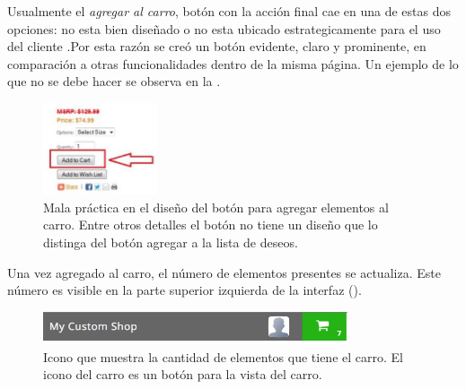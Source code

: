 		Usualmente el \textit{agregar al carro}, botón con la acción final \websiteINT \ecommerceCOM cae en una de estas dos opciones: no esta bien diseñado o no esta ubicado estrategicamente para el uso del cliente \cite{online_official_usabilitygeek_guidelines_usability}.Por esta razón se creó un botón evidente, claro y prominente, en comparación a otras funcionalidades dentro de la misma página. Un ejemplo de lo que no se debe hacer se observa en la .

		\begin{figure}[H]
			\centering
			\includegraphics[width=0.3\textwidth]{figuras/productos/examples/usabilitygeek_guidelines_wrong_ui_add_to_cart.png}
			\caption{Mala práctica en el diseño del botón para agregar elementos al carro. Entre otros detalles el botón no tiene un diseño que lo distinga del botón agregar a la lista de deseos.}
			\label{figure:apendice:productos:example:usabilitygeek_guidelines_wrong_ui_add_to_cart}
		\end{figure}

		Una vez agregado al carro, el número de elementos presentes se actualiza. Este número es visible en la parte superior izquierda de la interfaz ().

		\begin{figure}[H]
			\centering
			\includegraphics[width=0.8\textwidth]{figuras/solution/cart/header.png}
			\caption{Icono que muestra la cantidad de elementos que tiene el carro. El icono del carro es un botón para la vista del carro.}
			\label{figure:solution:cart:header}
		\end{figure}

